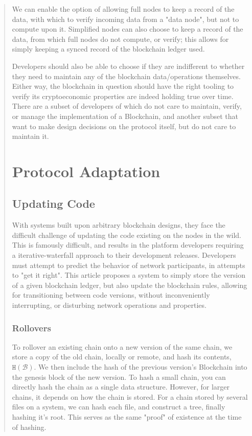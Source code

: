 \documentclass[12pt, titlepage, twocolumn]{report}
\begin{document}
\begin{quotation}
We can enable the option of allowing full nodes to keep a record of the data, with which to verify incoming data from a "data node", but not to compute upon it. Simplified nodes can also choose to keep a record of the data, from which full nodes do not compute, or verify; this allows for simply keeping a synced record of the blockchain ledger used. 

Developers should also be able to choose if they are indifferent to whether they need to maintain any of the blockchain data/operations themselves. Either way, the blockchain in question should have the right tooling to verify its cryptoeconomic properties are indeed holding true over time. There are a subset of developers of which do not care to maintain, verify, or manage the implementation of a Blockchain, and another subset that want to make design decisions on the protocol itself, but do not care to maintain it. 


\chapter{Protocol Adaptation}

\section{Updating Code}
With systems built upon arbitrary blockchain designs, they face the difficult challenge of updating the code existing on the nodes in the wild. This is famously difficult, and results in the platform developers requiring a iterative-waterfall approach to their development releases. Developers must attempt to predict the behavior of network participants, in attempts to "get it right". This article proposes a system to simply store the version of a given blockchain ledger, but also update the blockchain rules, allowing for transitioning between code versions, without inconveniently interrupting, or disturbing network operations and properties.  


\subsection{Rollovers}
To rollover an existing chain onto a new version of the same chain, we store a copy of the old chain, locally or remote, and hash its contents, \(\texttt{H}(\boldsymbol{\mathcal{B}})\). We then include the hash of the previous version's Blockchain into the genesis block of the new version. To hash a small chain, you can directly hash the chain as a single data structure. However, for larger chains, it depends on how the chain is stored. For a chain stored by several files on a system, we can hash each file, and construct a tree, finally hashing it's root. This serves as the same "proof" of existence at the time of hashing.



\end{quotation}
\end{document}
